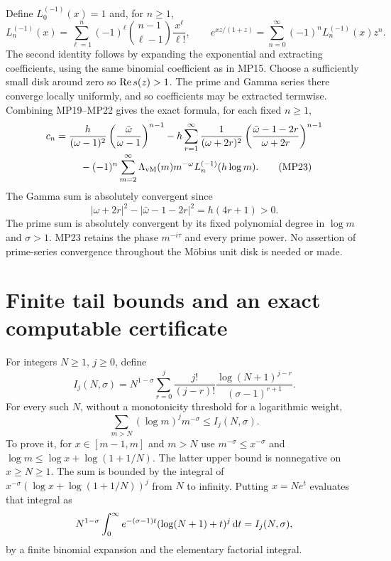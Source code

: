 \documentclass[11pt]{article}
\begin{document}
Define $L_0^{(-1)}(x)=1$ and, for $n\geq1$,
\begin{equation}
 L_n^{(-1)}(x)=\sum_{\ell=1}^n(-1)^\ell
             \binom{n-1}{\ell-1}\frac{x^\ell}{\ell!},\qquad
 e^{xz/(1+z)}=\sum_{n=0}^\infty(-1)^nL_n^{(-1)}(x)z^n.
 \tag{MP22}
\end{equation}
The second identity follows by expanding the exponential and extracting
coefficients, using the same binomial coefficient as in MP15.
Choose a sufficiently small disk around zero so $\operatorname{Re} s(z)>1$.
The prime and Gamma series there converge locally uniformly, and so
coefficients may be extracted termwise. Combining MP19--MP22 gives the
exact formula, for each fixed $n\geq1$,
\begin{align}
 c_n={}&\frac h{(\omega-1)^2}
                \left(\frac{\bar\omega}{\omega-1}\right)^{n-1}
 -h\sum_{r=1}^\infty\frac1{(\omega+2r)^2}
             \left(\frac{\bar\omega-1-2r}{\omega+2r}\right)^{n-1}
 \notag\\[-2pt]
 &\hspace{4mm}-(-1)^n\sum_{m=2}^\infty
           \Lambda_{\mathrm{vM}}(m)m^{-\omega}L_n^{(-1)}(h\log m).
 \tag{MP23}
\end{align}
The Gamma sum is absolutely convergent since
\begin{equation}
 |\omega+2r|^2-|\bar\omega-1-2r|^2=h(4r+1)>0.
 \tag{MP24}
\end{equation}
The prime sum is absolutely convergent by its fixed polynomial degree in
$\log m$ and $\sigma>1$. MP23 retains the phase $m^{-i\tau}$ and
every prime power. No assertion of prime-series convergence throughout
the Möbius unit disk is needed or made.

\section{Finite tail bounds and an exact computable certificate}
For integers $N\geq1$, $j\geq0$, define
\begin{equation}
 I_j(N,\sigma)=N^{1-\sigma}\sum_{r=0}^j
       \frac{j!}{(j-r)!}\frac{\log(N+1)^{j-r}}{(\sigma-1)^{r+1}}.
 \tag{MP25}
\end{equation}
For every such $N$, without a monotonicity threshold for a logarithmic
weight,
\begin{equation}
 \sum_{m>N}(\log m)^j m^{-\sigma}\leq I_j(N,\sigma).
 \tag{MP26}
\end{equation}
To prove it, for $x\in[m-1,m]$ and $m>N$ use
$m^{-\sigma}\leq x^{-\sigma}$ and
$\log m\leq\log x+\log(1+1/N)$. The latter upper bound is
nonnegative on $x\geq N\geq1$. The sum is bounded by the integral of
$x^{-\sigma}(\log x+\log(1+1/N))^j$ from $N$ to infinity.
Putting $x=Ne^t$ evaluates that integral as
\[
 N^{1-\sigma}\int_0^\infty e^{-(\sigma-1)t}
                     (\log(N+1)+t)^j\,\mathrm d t=I_j(N,\sigma),
\]
by a finite binomial expansion and the elementary factorial integral.
\end{document}
